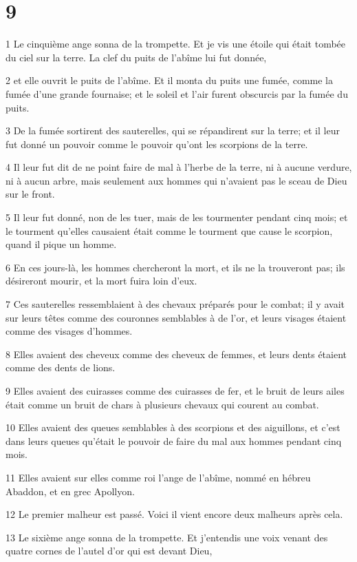\chapter{9}

\par 1 Le cinquième ange sonna de la trompette. Et je vis une étoile qui était tombée du ciel sur la terre. La clef du puits de l'abîme lui fut donnée,
\par 2 et elle ouvrit le puits de l'abîme. Et il monta du puits une fumée, comme la fumée d'une grande fournaise; et le soleil et l'air furent obscurcis par la fumée du puits.
\par 3 De la fumée sortirent des sauterelles, qui se répandirent sur la terre; et il leur fut donné un pouvoir comme le pouvoir qu'ont les scorpions de la terre.
\par 4 Il leur fut dit de ne point faire de mal à l'herbe de la terre, ni à aucune verdure, ni à aucun arbre, mais seulement aux hommes qui n'avaient pas le sceau de Dieu sur le front.
\par 5 Il leur fut donné, non de les tuer, mais de les tourmenter pendant cinq mois; et le tourment qu'elles causaient était comme le tourment que cause le scorpion, quand il pique un homme.
\par 6 En ces jours-là, les hommes chercheront la mort, et ils ne la trouveront pas; ils désireront mourir, et la mort fuira loin d'eux.
\par 7 Ces sauterelles ressemblaient à des chevaux préparés pour le combat; il y avait sur leurs têtes comme des couronnes semblables à de l'or, et leurs visages étaient comme des visages d'hommes.
\par 8 Elles avaient des cheveux comme des cheveux de femmes, et leurs dents étaient comme des dents de lions.
\par 9 Elles avaient des cuirasses comme des cuirasses de fer, et le bruit de leurs ailes était comme un bruit de chars à plusieurs chevaux qui courent au combat.
\par 10 Elles avaient des queues semblables à des scorpions et des aiguillons, et c'est dans leurs queues qu'était le pouvoir de faire du mal aux hommes pendant cinq mois.
\par 11 Elles avaient sur elles comme roi l'ange de l'abîme, nommé en hébreu Abaddon, et en grec Apollyon.
\par 12 Le premier malheur est passé. Voici il vient encore deux malheurs après cela.
\par 13 Le sixième ange sonna de la trompette. Et j'entendis une voix venant des quatre cornes de l'autel d'or qui est devant Dieu,
